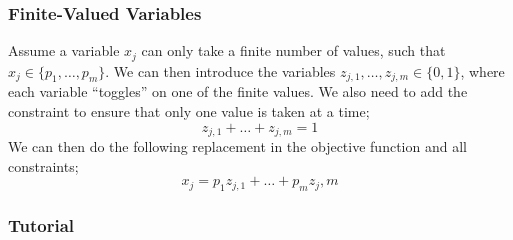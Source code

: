 \documentclass[a4paper, 12pt]{article}
\begin{document}
            \subsubsection*{Finite-Valued Variables}
                Assume a variable $x_j$ can only take a finite number of values, such that  $x_j \in \{p_1, \dots, p_m\}$.
                We can then introduce the variables $z_{j, 1}, \dots, z_{j, m} \in \{0, 1\}$, where each variable ``toggles'' on one of the finite values.
                We also need to add the constraint to ensure that only one value is taken at a time;
                $$z_{j, 1} + \dots + z_{j, m} = 1$$
                We can then do the following replacement in the objective function and all constraints;
                $$x_j = p_1 z_{j, 1} + \dots + p_m {z_j, m}$$
            \subsubsection*{Tutorial}
\end{document}
